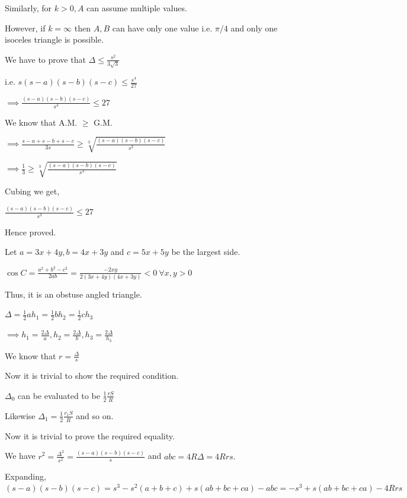   Similarly, for $k > 0, A$ can assume multiple values.

  However, if $k = \infty$ then $A, B$ can have only one value i.e. $\pi/4$ and only one isoceles triangle is possible.

\item We have to prove that $\Delta \leq \frac{s^2}{3\sqrt{3}}$

  i.e. $s(s - a)(s - b)(s - c) \leq \frac{s^4}{27}$

  $\implies \frac{(s - a)(s - b)(s - c)}{s^3}\leq 27$

  We know that A.M. $\geq$ G.M.

  $\implies \frac{s - a + s - b + s - c}{3s}\geq \sqrt[3]{\frac{(s - a)(s - b)(s - c)}{s^3}}$

  $\implies \frac{1}{3}\geq \sqrt[3]{\frac{(s - a)(s - b)(s - c)}{s^3}}$

  Cubing we get,

  $\frac{(s - a)(s - b)(s - c)}{s^3}\leq 27$

  Hence proved.

\item Let $a=3x+4y,b=4x+3y$ and $c=5x+5y$ be the largest side.

  $\cos C = \frac{a^2 + b^2 - c^2}{2ab} = \frac{-2xy}{2(3x + 4y)(4x + 3y)} < 0~\forall x, y >0$

  Thus, it is an obstuse angled triangle.

\item $\Delta = \frac{1}{2}ah_1 = \frac{1}{2}bh_2 = \frac{1}{2}ch_3$

  $\implies h_1 = \frac{2\Delta}{a}, h_2 = \frac{2\Delta}{b}, h_3 = \frac{2\Delta}{h_3}$

  We know that $r = \frac{\Delta}{s}$

  Now it is trivial to show the required condition.

\item $\Delta_0$ can be evaluated to be $\frac{1}{2}\frac{rS}{R}$

  Likewise $\Delta_1 = \frac{1}{2}\frac{r_1S}{R}$ and so on.

  Now it is trivial to prove the required equality.
\stopitemize

\subject{Challenging Problems}
\startitemize[n, 1*broad]
\item We have $r^2 = \frac{\Delta^2}{s^2} = \frac{(s - a)(s - b)(s - c)}{s}$ and $abc = 4R\Delta = 4Rrs.$

  Expanding, $(s - a)(s - b)(s - c) = s^3 - s^2(a + b + c) + s(ab + bc + ca) - abc = -s^3 + s(ab + bc + ca) - 4Rrs$

